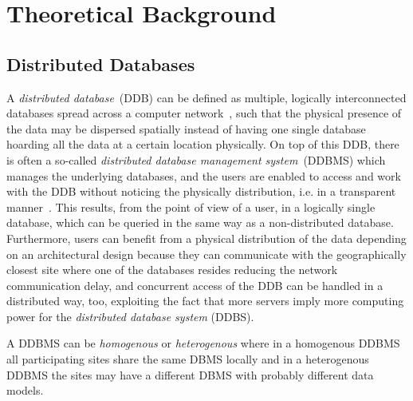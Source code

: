 
\section{Theoretical Background}
\label{sec:theo}

\subsection{Distributed Databases}
\label{subs:ddb}

A \emph{distributed database}~(DDB) can be defined as multiple, logically interconnected databases spread across a computer network~\cite[p.~4]{Ozsu1991}, such that the physical presence of the data may be dispersed spatially instead of having one single database hoarding all the data at a certain location physically. 
On top of this DDB, there is often a so-called \emph{distributed database management system}~(DDBMS) which manages the underlying databases, and the users are 
enabled to access and work with the DDB without noticing the physically distribution, i.e. in a transparent manner~\citep{Ozsu1991}. This results, from the point
of view of a user, in a logically single database, which can be queried in the same way as a non-distributed database. Furthermore, users can benefit from a
physical distribution of the data depending on an architectural design because they can communicate with the geographically closest site where one of the 
databases resides reducing the network communication delay, and concurrent access of the DDB can be handled in a distributed way, too, exploiting the fact that 
more servers imply more computing power for the \emph{distributed database system} (DDBS).

A DDBMS can be \emph{homogenous} or \emph{heterogenous} where in a homogenous DDBMS all participating sites share the same DBMS locally and in a heterogenous
DDBMS the sites may have a different DBMS with probably different data models.